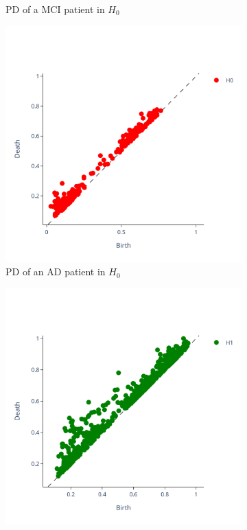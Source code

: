 \documentclass{article}
\begin{document}
\begin{figure}
\begin{subfigure}{0.32\textwidth}
    \caption{PD of a MCI patient in $H_0$}
  \end{subfigure}
  \begin{subfigure}{0.32\textwidth}
    \includegraphics[width=\textwidth]{figures/PDs/persistence_diagram_AD_H_0.png}
    \caption{PD of an AD patient in $H_0$}
  \end{subfigure}
  \begin{subfigure}{0.32\textwidth}
    \includegraphics[width=\textwidth]{figures/PDs/persistence_diagram_CN_H_1.png}

\end{subfigure}
\end{figure}
\end{document}
